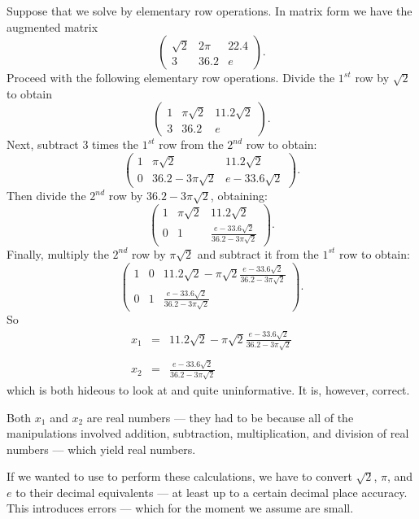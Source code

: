 Suppose that we solve  by elementary row
operations.  In  matrix form we have the augmented matrix
\[
\left(\begin{array}{cc|c} \sqrt{2} & 2\pi & 22.4\\
3 & 36.2 & e\end{array}\right).
\]
Proceed with the following elementary row operations. Divide the
$1^{st}$ row by $\sqrt{2}$ to obtain
\[
\left(\begin{array}{cc|c} 1 & \pi\sqrt{2} & 11.2\sqrt{2}\\
3 & 36.2 & e\end{array}\right).
\]
Next, subtract $3$ times the $1^{st}$ row from the $2^{nd}$ row
to obtain:
\[
\left(\begin{array}{cc|c} 1 & \pi\sqrt{2} & 11.2\sqrt{2}\\
0 & 36.2- 3\pi\sqrt{2} & e- 33.6\sqrt{2}\end{array}\right).
\]
Then divide the $2^{nd}$ row by $36.2-3\pi\sqrt{2}$,
obtaining:
\[
\left(\begin{array}{cc|c} 1 & \pi\sqrt{2} & 11.2\sqrt{2}\\
0 & 1 & \frac{e-33.6\sqrt{2}}{36.2-3\pi\sqrt{2}}\end{array}\right).
\]
Finally, multiply the $2^{nd}$ row by $\pi\sqrt{2}$ and
subtract it from the $1^{st}$ row to obtain:
\[
\left(\begin{array}{cc|c} 1 & 0 &
11.2\sqrt{2}-\pi\sqrt{2}\frac{e-33.6\sqrt{2}}{36.2-3\pi\sqrt{2}} \\
0 & 1 & \frac{e-33.6\sqrt{2}}{36.2-3\pi\sqrt{2}}\end{array}\right).
\]
So
\begin{eqnarray}
x_1 & = &  11.2\sqrt{2}-\pi\sqrt{2}\frac{e-33.6\sqrt{2}}{36.2-3\pi\sqrt{2}}
\nonumber
\\
  &  &   \label{e:irratans} \\
x_2 & = & \frac{e-33.6\sqrt{2}}{36.2-3\pi\sqrt{2}} \nonumber
\end{eqnarray}
which is both hideous to look at and quite uninformative.  It is,
however, correct.

Both $x_1$ and $x_2$ are real numbers --- they had to be because
all of the manipulations involved addition, subtraction,
multiplication, and division of real numbers --- which yield
real numbers.

If we wanted to use \Matlab to perform these calculations, we
have to convert $\sqrt{2}$, $\pi$, and $e$ to their
decimal equivalents --- at least up to a certain decimal place
accuracy. This introduces errors --- which for the moment we
assume are small.

